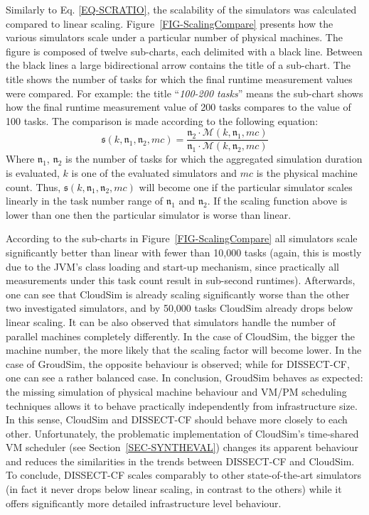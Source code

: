\documentclass[sort, compress, 5p]{elsarticle}
\begin{document}
Similarly to Eq. \ref{EQ-SCRATIO}, the scalability of the simulators was calculated compared to linear scaling. Figure~\ref{FIG-ScalingCompare} presents how the various simulators scale under a particular number of physical machines. The figure is composed of twelve sub-charts, each delimited with a black line. Between the black lines a large bidirectional arrow contains the title of a sub-chart. The title shows the number of tasks for which the final runtime measurement values were compared. For example: the title ``\emph{100-200 tasks}'' means the sub-chart shows how the final runtime measurement value of 200 tasks compares to the value of 100 tasks. The comparison is made according to the following equation:
\begin{equation}
\mathfrak{s}(k,\mathfrak{n_1},\mathfrak{n_2},mc)=\frac{\mathfrak{n_2}\cdot\mathcal{M}(k,\mathfrak{n_1},mc)}{\mathfrak{n_1}\cdot\mathcal{M}(k,\mathfrak{n_2},mc)}
\end{equation}
Where $\mathfrak{n_1}$, $\mathfrak{n_2}$ is the number of tasks for which the aggregated simulation duration is evaluated, $k$ is one of the evaluated simulators and $mc$ is the physical machine count. Thus, $\mathfrak{s}(k,\mathfrak{n_1},\mathfrak{n_2},mc)$ will become one if the particular simulator scales linearly in the task number range of $\mathfrak{n_1}$ and $\mathfrak{n_2}$. If the scaling function above is lower than one then the particular simulator is worse than linear. 

According to the sub-charts in Figure~\ref{FIG-ScalingCompare} all simulators scale significantly better than linear with fewer than 10,000 tasks (again, this is mostly due to the JVM's class loading and start-up mechanism, since practically all measurements under this task count result in sub-second runtimes). Afterwards, one can see that CloudSim is already scaling significantly worse than the other two investigated simulators, and by 50,000 tasks CloudSim already drops below linear scaling. It can be also observed that simulators handle the number of parallel machines completely differently. In the case of CloudSim, the bigger the machine number, the more likely that the scaling factor will become lower. In the case of GroudSim, the opposite behaviour is observed; while for DISSECT-CF, one can see a rather balanced case. In conclusion, GroudSim behaves as expected: the missing simulation of physical machine behaviour and VM/PM scheduling techniques allows it to behave practically independently from infrastructure size. In this sense, CloudSim and DISSECT-CF should behave more closely to each other. Unfortunately, the problematic implementation of CloudSim's time-shared VM scheduler (see Section~\ref{SEC-SYNTHEVAL}) changes its apparent behaviour and reduces the similarities in the trends between DISSECT-CF and CloudSim. To conclude, DISSECT-CF scales comparably to other state-of-the-art simulators (in fact it never drops below linear scaling, in contrast to the others) while it offers significantly more detailed infrastructure level behaviour.
\end{document}
